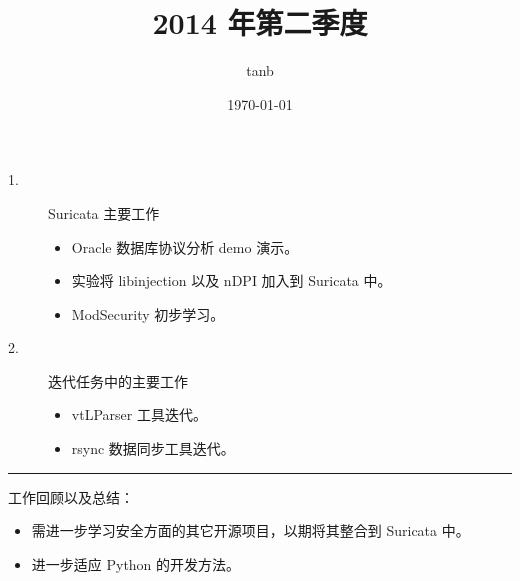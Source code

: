 \documentclass{article}
\title{2014 年第二季度}
\author{tanb}
\date{\today}
\begin{document}
\maketitle

\begin{description}
    \item [1.] Suricata 主要工作
        \begin{itemize}
            \item Oracle 数据库协议分析 demo 演示。
            \item 实验将 libinjection 以及 nDPI 加入到 Suricata 中。
            \item ModSecurity 初步学习。
        \end{itemize}

    \item [2.] 迭代任务中的主要工作
        \begin{itemize}
            \item vtLParser 工具迭代。
            \item rsync 数据同步工具迭代。
        \end{itemize}
\end{description}

\rule{\textwidth}{1.5pt}
工作回顾以及总结：
\begin{itemize}
    \item 需进一步学习安全方面的其它开源项目，以期将其整合到 Suricata 中。
    \item 进一步适应 Python 的开发方法。
\end{itemize}
\end{document}
